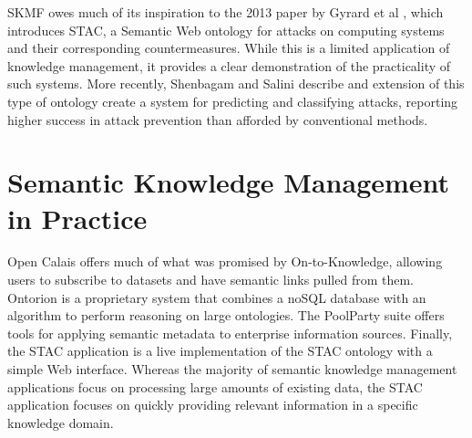 SKMF owes much of its inspiration to the 2013 paper by Gyrard et al
\cite{ontosec},
which introduces STAC, a Semantic Web ontology for attacks on computing systems and their corresponding countermeasures. While this is a limited application of knowledge management, it provides a clear demonstration of the practicality of such systems. More recently, Shenbagam and Salini
\cite{vulncontol}
describe and extension of this type of ontology create a system for predicting and classifying attacks, reporting higher success in attack prevention than afforded by conventional methods.


\section{Semantic Knowledge Management in Practice}
\label{applications}

Open Calais
\cite{opencalais}
offers much of what was promised by On-to-Knowledge, allowing users to subscribe to datasets and have semantic links pulled from them. Ontorion
\cite{ontorion}
is a proprietary system that combines a noSQL database with an algorithm to perform reasoning on large ontologies. The PoolParty suite
\cite{poolparty}
offers tools for applying semantic metadata to enterprise information sources. Finally, the STAC application
\cite{stacweb}
is a live implementation of the STAC ontology with a simple Web interface. Whereas the majority of semantic knowledge management applications focus on processing large amounts of existing data, the STAC application focuses on quickly providing relevant information in a specific knowledge domain.
